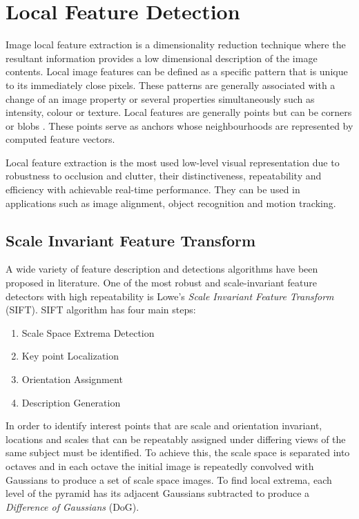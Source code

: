 \documentclass{l4proj}
\begin{document}
\section{Local Feature Detection}



Image local feature extraction is a dimensionality reduction technique where the resultant information provides a low dimensional description of the image contents. Local image features can be defined as a specific pattern that is unique to its immediately close pixels. These patterns are generally associated with a change of an image property or several properties simultaneously such as intensity, colour or texture. Local features are generally points but can be corners or blobs \citep{Tinne08}. These points serve as anchors whose neighbourhoods are represented by computed feature vectors. 

Local feature extraction is the most used low-level visual representation due to robustness to occlusion and clutter, their distinctiveness, repeatability and efficiency with achievable real-time performance. They can be used in applications such as image alignment, object recognition and motion tracking.   


\subsection{Scale Invariant Feature Transform}

A wide variety of feature description and detections algorithms have been proposed in literature. One of the most robust and scale-invariant feature detectors with high repeatability is Lowe's \textit{Scale Invariant Feature Transform} (SIFT). SIFT algorithm has four main steps:





\begin{enumerate}
  \item Scale Space Extrema Detection
  \item Key point Localization
  \item Orientation Assignment
  \item Description Generation 
\end{enumerate}





In order to identify interest points that are scale and orientation invariant, locations and scales that can be repeatably assigned under differing views of the same subject must be identified.  To achieve this, the scale space is separated into octaves and in each octave the initial image is repeatedly convolved with Gaussians to produce a set of scale space images. To find local extrema, each level of the pyramid has its adjacent Gaussians subtracted to produce a \textit{Difference of Gaussians} (DoG). 
\end{document}
